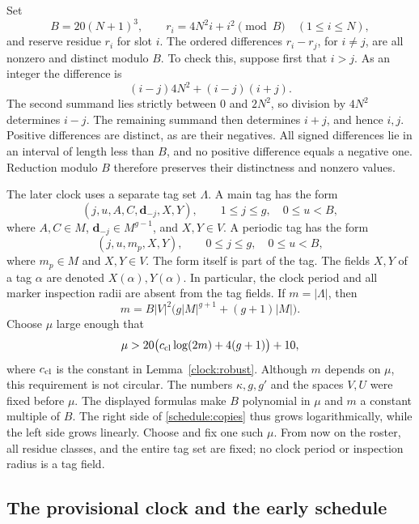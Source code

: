 Set
\begin{equation}\label{schedule:slot-residues}
 B=20(N+1)^3,
 \qquad r_i=4N^2i+i^2\pmod B\quad(1\le i\le N),
\end{equation}
and reserve residue $r_i$ for slot $i$.  The ordered differences $r_i-r_j$,
for $i\ne j$, are all nonzero and distinct modulo $B$.  To check this,
suppose first that $i>j$.  As an integer the difference is
\[
 (i-j)4N^2+(i-j)(i+j).
\]
The second summand lies strictly between $0$ and $2N^2$, so division by
$4N^2$ determines $i-j$.  The remaining summand then determines $i+j$,
and hence $i,j$.  Positive differences are distinct, as are their negatives.
All signed differences lie in an interval of length less than $B$, and no
positive difference equals a negative one.  Reduction modulo $B$ therefore
preserves their distinctness and nonzero values.

The later clock uses a separate tag set $\Lambda$. A main tag has the form
\[
 (j,u,A,C,\mathbf d_{-j},X,Y),\qquad 1\le j\le g,\quad 0\le u<B,
\]
where $A,C\in M$, $\mathbf d_{-j}\in M^{g-1}$, and $X,Y\in V$.
A periodic tag has the form
\[
 (j,u,m_p,X,Y),\qquad 0\le j\le g,\quad 0\le u<B,
\]
where $m_p\in M$ and $X,Y\in V$.
The form itself is part of the tag.  The fields $X,Y$ of a tag $\alpha$ are
denoted $X(\alpha),Y(\alpha)$.  In particular, the clock period and all
marker inspection radii are absent from the tag fields.  If $m=|\Lambda|$,
then
\[
 m=B|V|^2\bigl(g|M|^{g+1}+(g+1)|M|\bigr).
\]
Choose $\mu$ large enough that
\begin{equation}\label{schedule:copies}
 \mu>20\bigl(c_{\rm cl}\log(2m)+4(g+1)\bigr)+10,
\end{equation}
where $c_{\rm cl}$ is the constant in Lemma~\ref{clock:robust}.
Although $m$ depends on $\mu$, this requirement is not circular.
The numbers $\kappa,g,g'$ and the spaces $V,U$ were fixed before $\mu$.
The displayed formulas make $B$ polynomial in $\mu$ and $m$ a constant
multiple of $B$. The right side of \eqref{schedule:copies} thus grows
logarithmically, while the left side grows linearly. Choose and fix one
such $\mu$. From now on the roster, all residue classes, and the entire
tag set are fixed; no clock period or inspection radius is a tag field.

\subsection{The provisional clock and the early schedule}

